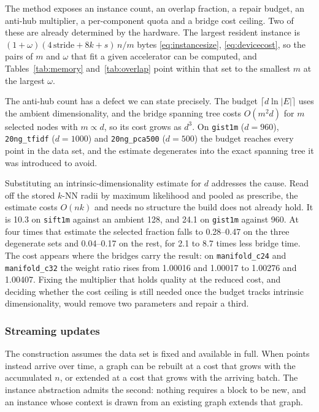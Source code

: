 \documentclass{ieeeaccess}
\begin{document}
The method exposes an instance count, an overlap fraction, a repair budget, an
anti-hub multiplier, a per-component quota and a bridge cost ceiling. Two of
these are already determined by the hardware. The largest resident instance is
$(1 + \omega)(4\,\mathrm{stride} + 8k + s)\,n/m$ bytes
\eqref{eq:instancesize}, \eqref{eq:devicecost}, so the pairs of $m$ and $\omega$
that fit a given accelerator can be computed, and Tables~\ref{tab:memory}
and~\ref{tab:overlap} point within that set to the smallest $m$ at the largest
$\omega$.

The anti-hub count has a defect we can state precisely. The budget
$\lceil d \ln|E| \rceil$ uses the ambient dimensionality, and the bridge spanning
tree costs $O(m^2 d)$ for $m$ selected nodes with $m \propto d$, so its cost
grows as $d^3$. On \texttt{gist1m} ($d = 960$), \texttt{20ng\_tfidf}
($d = 1000$) and \texttt{20ng\_pca500} ($d = 500$) the budget reaches every point
in the data set, and the estimate degenerates into the exact spanning tree it was
introduced to avoid.

Substituting an intrinsic-dimensionality estimate for $d$ addresses the cause.
Read off the stored $k$-NN radii by maximum likelihood \cite{levina_bickel} and
pooled as \cite{mackay_ghahramani} prescribe, the estimate costs $O(nk)$ and
needs no structure the build does not already hold. It is 10.3 on
\texttt{sift1m} against an ambient 128, and 24.1 on
\texttt{gist1m} against 960. At four times that estimate the selected fraction
falls to 0.28--0.47 on the three degenerate sets and 0.04--0.17 on the rest, for
2.1 to 8.7 times less bridge time. The cost appears where the bridges carry the
result: on \texttt{manifold\_c24} and \texttt{manifold\_c32} the weight ratio
rises from 1.00016 and 1.00017 to 1.00276 and 1.00407. Fixing the multiplier that
holds quality at the reduced cost, and deciding whether the cost ceiling is still
needed once the budget tracks intrinsic dimensionality, would remove two
parameters and repair a third.

\subsubsection{Streaming updates}

The construction assumes the data set is fixed and available in full. When points
instead arrive over time, a graph can be rebuilt at a cost that grows with the
accumulated $n$, or extended at a cost that grows with the arriving batch. The
instance abstraction admits the second: nothing requires a block to be new, and
an instance whose context is drawn from an existing graph extends that graph.
\end{document}
